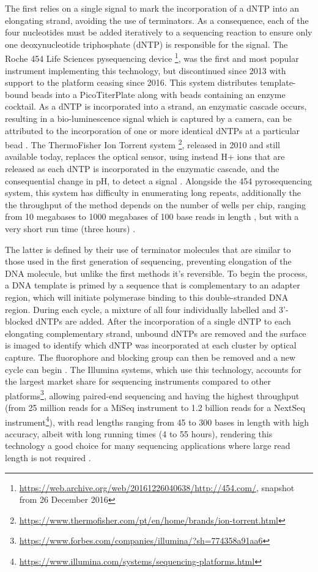 The first relies on a single signal to mark the incorporation of a dNTP into an elongating strand, avoiding the use of terminators. As a consequence, each of the four nucleotides must be added iteratively to a sequencing reaction to ensure only one deoxynucleotide triphosphate (dNTP) is responsible for the signal. The Roche 454 Life Sciences pysequencing device \footnote{\url{https://web.archive.org/web/20161226040638/http://454.com/}, snapshot from 26 December 2016}, was the first and most popular instrument implementing this technology, but discontinued since 2013 with support to the platform ceasing since 2016. This system distributes template-bound beads into a PicoTiterPlate along with beads containing an enzyme cocktail. As a dNTP is incorporated into a strand, an enzymatic cascade occurs, resulting in a bio-luminescence signal which is captured by a camera, can be attributed to the incorporation of one or more identical dNTPs at a particular bead \citep{goodwin_coming_2016}. The ThermoFisher Ion Torrent system \footnote{\url{https://www.thermofisher.com/pt/en/home/brands/ion-torrent.html}}, released in 2010 and still available today, replaces the optical sensor, using instead  H+ ions that are released as each dNTP is incorporated in the enzymatic cascade, and the consequential change in pH, to detect a signal \citep{goodwin_coming_2016}. Alongside the 454 pyrosequencing system, this system has difficulty in enumerating long repeats, additionally the the throughput of the method depends on the number of wells per chip, ranging from 10 megabases to 1000 megabases of 100 base reads in length , but with a very short run time (three hours) \citep{hagemann_overview_2015, loman_performance_2012}.

The latter is defined by their use of terminator molecules that are similar to those used in the first generation of sequencing, preventing elongation of the DNA molecule, but unlike the first methods it's reversible. To begin the process, a DNA template is primed by a sequence that is complementary to an adapter region, which will initiate polymerase binding to this double-stranded DNA region. During each cycle, a mixture of all four individually labelled and 3'-blocked dNTPs are added. After the incorporation of a single dNTP to each elongating complementary strand, unbound dNTPs are removed and the surface is imaged to identify which dNTP was incorporated at each cluster by optical capture. The fluorophore and blocking group can then be removed and a new cycle can begin \citep{goodwin_coming_2016}. The Illumina systems, which use this technology, accounts for the largest market share for sequencing instruments compared to other platforms\footnote{\url{https://www.forbes.com/companies/illumina/?sh=774358a91aa6}}, allowing paired-end sequencing and having the highest throughput (from 25 million reads for a MiSeq instrument to  1.2 billion reads for a NextSeq instrument\footnote{\url{https://www.illumina.com/systems/sequencing-platforms.html}}), with read lengths ranging from 45 to 300 bases in length with high accuracy, albeit with long running times (4 to 55 hours), rendering this technology a good choice for many sequencing applications where large read length is not required \citep{loman_performance_2012, gupta_chapter_2014, hagemann_overview_2015}.


